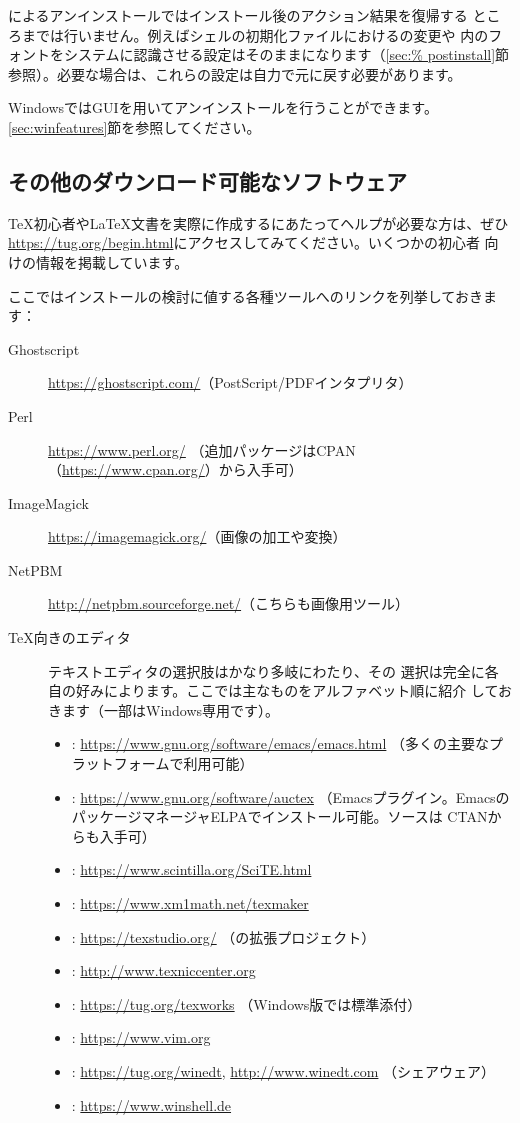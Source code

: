 \documentclass[uplatex,dvipdfmx,12pt,tombow]{jsarticle}
\begin{document}
によるアンインストールではインストール後のアクション結果を復帰する
ところまでは行いません。例えばシェルの初期化ファイルにおけるの変更や
\TL 内のフォントをシステムに認識させる設定はそのままになります（\ref{sec:%
postinstall}節参照）。必要な場合は、これらの設定は自力で元に戻す必要があります。

WindowsではGUIを用いてアンインストールを行うことができます。
\ref{sec:winfeatures}節を参照してください。

\subsection{その他のダウンロード可能なソフトウェア}

\TeX 初心者や\LaTeX 文書を実際に作成するにあたってヘルプが必要な方は、ぜひ
\url{https://tug.org/begin.html}にアクセスしてみてください。いくつかの初心者
向けの情報を掲載しています。

ここではインストールの検討に値する各種ツールへのリンクを列挙しておきます：
%
\begin{description}
\item[Ghostscript] \url{https://ghostscript.com/}（PostScript/PDFインタプリタ）
\item[Perl] \url{https://www.perl.org/}%
  （追加パッケージはCPAN（\url{https://www.cpan.org/}）から入手可）
\item[ImageMagick] \url{https://imagemagick.org/}（画像の加工や変換）
\item[NetPBM] \url{http://netpbm.sourceforge.net/}（こちらも画像用ツール）
\item[\TeX 向きのエディタ] テキストエディタの選択肢はかなり多岐にわたり、その
  選択は完全に各自の好みによります。ここでは主なものをアルファベット順に紹介
  しておきます（一部はWindows専用です）。
  \begin{itemize}
  \item {}: \url{https://www.gnu.org/software/emacs/emacs.html}%
    （多くの主要なプラットフォームで利用可能）
  \item {}: \url{https://www.gnu.org/software/auctex}%
    （Emacsプラグイン。EmacsのパッケージマネージャELPAでインストール可能。ソースは
    CTANからも入手可）
  \item {}: \url{https://www.scintilla.org/SciTE.html}
  \item {}: \url{https://www.xm1math.net/texmaker}
  \item {}: \url{https://texstudio.org/}%
    （の拡張プロジェクト）
  \item {}: \url{http://www.texniccenter.org}
  \item {}: \url{https://tug.org/texworks}%
    （Windows版\TL では標準添付）
  \item {}: \url{https://www.vim.org}
  \item {}: \url{https://tug.org/winedt}, \url{http://www.winedt.com}%
    （シェアウェア）
  \item {}: \url{https://www.winshell.de}
  \end{itemize}
\end{description}
\end{document}
